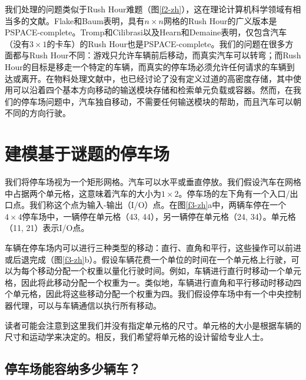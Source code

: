 我们处理的问题类似于Rush Hour难题（图\ref{f2-zh}），这在理论计算机科学领域有相当多的文献。Flake和Baum表明，具有$n \times n$网格的Rush Hour的广义版本是PSPACE-complete。Tromp和Cilibrasi以及Hearn和Demaine表明，仅包含汽车（没有$3 \times 1$的卡车）的Rush Hour也是PSPACE-complete。我们的问题在很多方面都与Rush Hour不同：游戏只允许车辆前后移动，而真实汽车可以转弯；而Rush Hour的目标是移走一个特定的车辆，而真实的停车场必须允许任何请求的车辆到达或离开。在物料处理文献中，也已经讨论了没有定义过道的高密度存储，其中使用可以沿着四个基本方向移动的输送模块存储和检索单元负载或容器。然而，在我们的停车场问题中，汽车独自移动，不需要任何输送模块的帮助，而且汽车可以朝不同的方向行驶。

\section{建模基于谜题的停车场}

我们将停车场视为一个矩形网格。汽车可以水平或垂直停放。我们假设汽车在网格中占据两个单元格，这意味着汽车的大小为$1 \times 2$。停车场的左下角有一个入口/出口点。我们称这个点为输入-输出（I/O）点。在图\ref{f3-zh}a中，两辆车停在一个$4 \times 4$停车场中，一辆停在单元格（43, 44），另一辆停在单元格（24, 34）。单元格（11, 21）表示I/O点。


车辆在停车场内可以进行三种类型的移动：直行、直角和平行，这些操作可以前进或后退完成（图\ref{f3-zh}b）。假设车辆花费一个单位的时间在一个单元格上行驶，可以为每个移动分配一个权重以量化行驶时间。例如，车辆进行直行时移动一个单元格，因此将此移动分配一个权重为一。类似地，车辆进行直角和平行移动时移动四个单元格，因此将这些移动分配一个权重为四。我们假设停车场中有一个中央控制器代理，可以与车辆通信以执行所有移动。

读者可能会注意到这里我们并没有指定单元格的尺寸。单元格的大小是根据车辆的尺寸和运动学来决定的。相反，我们希望将单元格的设计留给专业人士。

\subsection{停车场能容纳多少辆车？}

